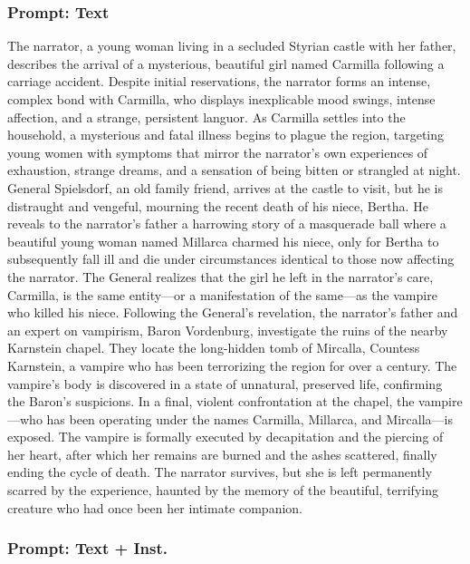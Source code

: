 \documentclass{article} %
\begin{document}
\subsubsection{Prompt: Text}

The narrator, a young woman living in a secluded Styrian castle with her father, describes the arrival of a mysterious, beautiful girl named Carmilla following a carriage accident. Despite initial reservations, the narrator forms an intense, complex bond with Carmilla, who displays inexplicable mood swings, intense affection, and a strange, persistent languor. As Carmilla settles into the household, a mysterious and fatal illness begins to plague the region, targeting young women with symptoms that mirror the narrator’s own experiences of exhaustion, strange dreams, and a sensation of being bitten or strangled at night. General Spielsdorf, an old family friend, arrives at the castle to visit, but he is distraught and vengeful, mourning the recent death of his niece, Bertha. He reveals to the narrator’s father a harrowing story of a masquerade ball where a beautiful young woman named Millarca charmed his niece, only for Bertha to subsequently fall ill and die under circumstances identical to those now affecting the narrator. The General realizes that the girl he left in the narrator's care, Carmilla, is the same entity—or a manifestation of the same—as the vampire who killed his niece. Following the General’s revelation, the narrator’s father and an expert on vampirism, Baron Vordenburg, investigate the ruins of the nearby Karnstein chapel. They locate the long-hidden tomb of Mircalla, Countess Karnstein, a vampire who has been terrorizing the region for over a century. The vampire's body is discovered in a state of unnatural, preserved life, confirming the Baron's suspicions. In a final, violent confrontation at the chapel, the vampire—who has been operating under the names Carmilla, Millarca, and Mircalla—is exposed. The vampire is formally executed by decapitation and the piercing of her heart, after which her remains are burned and the ashes scattered, finally ending the cycle of death. The narrator survives, but she is left permanently scarred by the experience, haunted by the memory of the beautiful, terrifying creature who had once been her intimate companion.

\subsubsection{Prompt: Text + Inst.}
\end{document}
